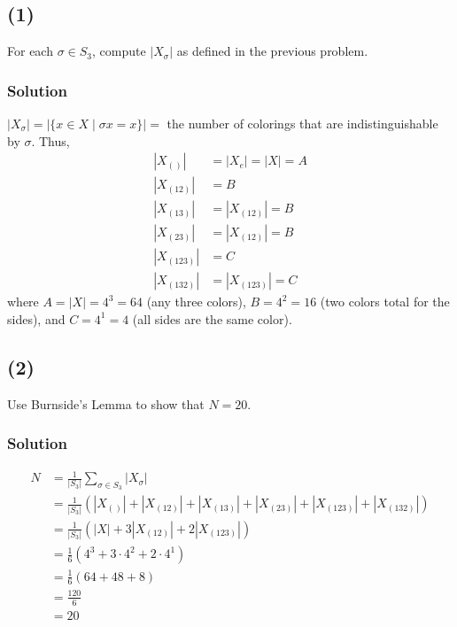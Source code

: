 \documentclass[fleqn]{article}
\begin{document}
        \subsection{(1)}
        For each $\sigma \in S_3$, compute $|X_\sigma|$ as defined in the previous problem.
            
            \subsubsection{Solution}
            $|X_\sigma| = |\{x \in X \mid \sigma x = x\}| = $ the number of colorings that are indistinguishable by $\sigma$.  Thus,
            \begin{align}
                |X_{()}| &= |X_e| = |X| = A \\
                |X_{(12)}| &= B \\
                |X_{(13)}| &= |X_{(12)}| = B \\
                |X_{(23)}| &= |X_{(12)}| = B \\
                |X_{(123)}| &= C \\
                |X_{(132)}| &= |X_{(123)}| = C
            \end{align}
            where $A = |X| = 4^3 = 64$ (any three colors), $B = 4^2 = 16$ (two colors total for the sides), and $C = 4^1 = 4$ (all sides are the same color).
        
        \subsection{(2)}
        Use Burnside's Lemma to show that $N = 20$.
            
            \subsubsection{Solution}
            \begin{align}
                N &= \frac{1}{|S_3|} \sum\limits_{\sigma \in S_3} |X_\sigma| \\
                    &= \frac{1}{|S_3|} \left(|X_{()}| + |X_{(12)}| + |X_{(13)}| + |X_{(23)}| + |X_{(123)}| + |X_{(132)}|\right) \\
                    &= \frac{1}{|S_3|} \left(|X| + 3|X_{(12)}| + 2|X_{(123)}|\right) \\
                    &= \frac{1}{6} \left(4^3 + 3 \cdot 4^2 + 2 \cdot 4^1\right) \\
                    &= \frac{1}{6} \left(64 + 48 + 8\right) \\
                    &= \frac{120}{6} \\
                    &= 20
            \end{align}
    
\end{document}
